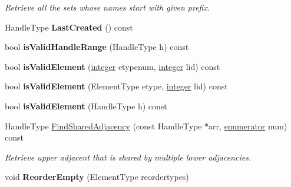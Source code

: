 \begin{DoxyCompactItemize}
\begin{DoxyCompactList}\small\item\em Retrieve all the sets whose names start with given prefix. \end{DoxyCompactList}\item 
\hypertarget{classINMOST_1_1Mesh_a9e00078afcbee494f8e4c02d1e088203}{Handle\-Type {\bfseries Last\-Created} () const }\label{classINMOST_1_1Mesh_a9e00078afcbee494f8e4c02d1e088203}

\item 
\hypertarget{classINMOST_1_1Mesh_ab446c474d012ad8a16e82cf8b297d084}{bool {\bfseries is\-Valid\-Handle\-Range} (Handle\-Type h) const }\label{classINMOST_1_1Mesh_ab446c474d012ad8a16e82cf8b297d084}

\item 
\hypertarget{classINMOST_1_1Mesh_a05701da4bd3ed8ca69bbcca256c2b0e2}{bool {\bfseries is\-Valid\-Element} (\hyperlink{classINMOST_1_1Storage_aec96942bc647417a801e2895b45964d2}{integer} etypenum, \hyperlink{classINMOST_1_1Storage_aec96942bc647417a801e2895b45964d2}{integer} lid) const }\label{classINMOST_1_1Mesh_a05701da4bd3ed8ca69bbcca256c2b0e2}

\item 
\hypertarget{classINMOST_1_1Mesh_aed6fa04f985b48852a2fd6305364983e}{bool {\bfseries is\-Valid\-Element} (Element\-Type etype, \hyperlink{classINMOST_1_1Storage_aec96942bc647417a801e2895b45964d2}{integer} lid) const }\label{classINMOST_1_1Mesh_aed6fa04f985b48852a2fd6305364983e}

\item 
\hypertarget{classINMOST_1_1Mesh_aefe80cb31b7763f7124d013050c21e3e}{bool {\bfseries is\-Valid\-Element} (Handle\-Type h) const }\label{classINMOST_1_1Mesh_aefe80cb31b7763f7124d013050c21e3e}

\item 
Handle\-Type \hyperlink{classINMOST_1_1Mesh_a116f510afe89689b615fa73b29bc6f59}{Find\-Shared\-Adjacency} (const Handle\-Type $\ast$arr, \hyperlink{classINMOST_1_1Storage_ae333dfced6fa9cfde0c8e7dcf1b0cc2b}{enumerator} num) const 
\begin{DoxyCompactList}\small\item\em Retrieve upper adjacent that is shared by multiple lower adjacencies. \end{DoxyCompactList}\item 
\hypertarget{classINMOST_1_1Mesh_ae5191aea52d0cb3b8719500bc98d72df}{void {\bfseries Reorder\-Empty} (Element\-Type reordertypes)}\label{classINMOST_1_1Mesh_ae5191aea52d0cb3b8719500bc98d72df}


\end{DoxyCompactItemize}
